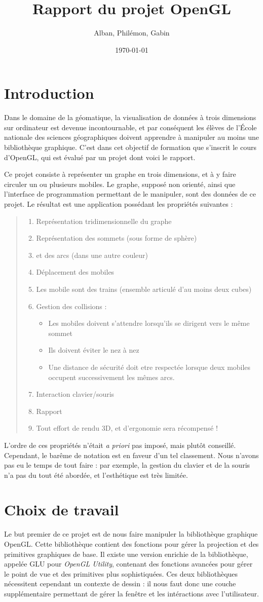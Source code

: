 \documentclass[a4paper, oneside, 11pt, twocolumn]{article}
\title{Rapport du projet OpenGL}
\author{\bsc{Kraus} Alban, \bsc{Pensier} Philémon, \bsc{Schittek} Gabin}
\date{\today}
\newcommand{\sujet}{
\begin{quotation}
  \noindent
  \begin{enumerate}
  \item Représentation tridimensionnelle du graphe
  \item Représentation des sommets (sous forme de sphère)
  \item et des arcs (dans une autre couleur)
  \item Déplacement des mobiles
  \item Les mobile sont des trains (ensemble articulé d’au moins deux cubes)
  \item Gestion des collisions :
    \begin{itemize}
    \item Les mobiles doivent s’attendre lorsqu’ils se dirigent vers le même sommet
    \item Ils doivent éviter le nez à nez
    \item Une distance de sécurité doit etre respectée lorsque deux mobiles occupent successivement les
      mêmes arcs.
    \end{itemize}
  \item Interaction clavier/souris
  \item Rapport
  \item Tout effort de rendu 3D, et d’ergonomie sera récompensé !
  \end{enumerate}
\end{quotation}
}
\begin{document}
\maketitle

\bigskip

\tableofcontents

\clearpage

\section{Introduction}

Dans le domaine de la géomatique, la visualisation de données à trois dimensions sur ordinateur est devenue incontournable, et par conséquent les élèves de l'École nationale des sciences géographiques doivent apprendre à manipuler au moins une bibliothèque graphique. C'est dans cet objectif de formation que s'inscrit le cours d'OpenGL, qui est évalué par un projet dont voici le rapport.

Ce projet consiste à représenter un graphe en trois dimensions, et à y faire circuler un ou plusieurs mobiles. Le graphe, supposé non orienté, ainsi que l'interface de programmation permettant de le manipuler, sont des données de ce projet. Le résultat est une application possédant les propriétés suivantes :

\sujet

L'ordre de ces propriétés n'était \emph{a priori} pas imposé, mais plutôt conseillé. Cependant, le barême de notation est en faveur d'un tel classement. Nous n'avons pas eu le temps de tout faire : par exemple, la gestion du clavier et de la souris n'a pas du tout été abordée, et l'esthétique est très limitée.

\section{Choix de travail}

Le but premier de ce projet est de nous faire manipuler la bibliothèque graphique OpenGL. Cette bibliothèque contient des fonctions pour gérer la projection et des primitives graphiques de base. Il existe une version enrichie de la bibliothèque, appelée GLU pour \emph{OpenGL Utility}, contenant des fonctions avancées pour gérer le point de vue et des primitives plus sophistiquées. Ces deux bibliothèques nécessitent cependant un contexte de dessin : il nous faut donc une couche supplémentaire permettant de gérer la fenêtre et les intéractions avec l'utilisateur.
\end{document}

